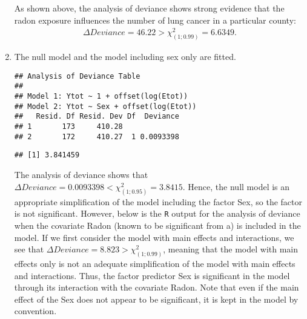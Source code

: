 \begin{solution}{6.6}
\begin{enumerate}
As shown above, the analysis of deviance shows strong evidence that the radon exposure influences the number of lung cancer in a particular county:
\begin{align*}
\Delta Deviance = 46.22 > \chi^{2}_{(1;0.99)}=6.6349.
\end{align*}

\item The null model and the model including sex only are fitted.
\begin{knitrout}
\color{fgcolor}\begin{kframe}
\begin{alltt}
 \hlkwb{<-} \hlopt{~}\hlopt{+}\hlstd{(}
 \hlkwb{<-} \hlopt{~}\hlopt{+}\hlstd{(}
\end{alltt}
\begin{verbatim}
## Analysis of Deviance Table
##
## Model 1: Ytot ~ 1 + offset(log(Etot))
## Model 2: Ytot ~ Sex + offset(log(Etot))
##   Resid. Df Resid. Dev Df  Deviance
## 1       173     410.28
## 2       172     410.27  1 0.0093398
\end{verbatim}
\begin{alltt}
\hlstd{(}\hlstd{,}\hlstd{)}
\end{alltt}
\begin{verbatim}
## [1] 3.841459
\end{verbatim}
\end{kframe}
\end{knitrout}
The analysis of deviance shows that $\Delta Deviance= 0.0093398<\chi^{2}_{(1;0.95)}=3.8415$. Hence, the null model is an appropriate simplification of the model including the factor Sex, so the factor is not significant. However, below is the \texttt{R} output for the analysis of deviance when the covariate Radon (known to be significant from a) is included in the model. If we first consider the model with main effects and interactions, we see that $\Delta Deviance= 8.823>\chi^{2}_{(1;0.99)}$, meaning that the model with main effects only is not an adequate simplification of the model with main effects and interactions. Thus, the factor predictor Sex is significant in the model through its interaction with the covariate Radon. Note that even if the main effect of the Sex does not appear to be significant, it is kept in the model by convention.


\end{enumerate}
\end{solution}

